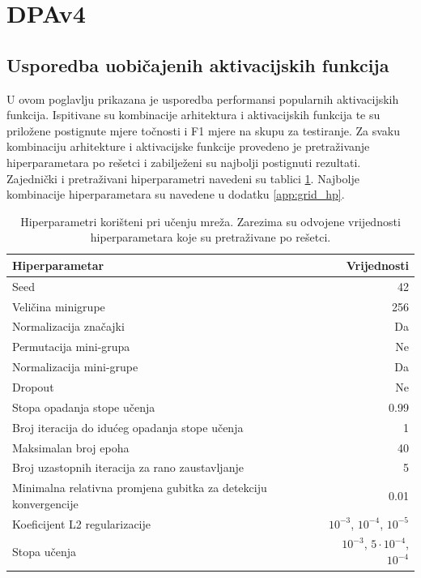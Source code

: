 \documentclass[times, utf8, numeric, diplomski]{fer}
\begin{document}
\section{DPAv4}

\subsection{Usporedba uobičajenih aktivacijskih funkcija}

U ovom poglavlju prikazana je usporedba performansi popularnih aktivacijskih funkcija. Ispitivane su kombinacije arhitektura i aktivacijskih funkcija te su priložene postignute mjere točnosti i F1 mjere na skupu za testiranje. Za svaku kombinaciju arhitekture i aktivacijske funkcije provedeno je pretraživanje hiperparametara po rešetci i zabilježeni su najbolji postignuti rezultati. Zajednički i pretraživani hiperparametri navedeni su tablici \ref{tab:hp_common}. Najbolje kombinacije hiperparametara su navedene u dodatku \ref{app:grid_hp}.

\begin{table}
\centering
\begin{tabular}{lr}
Hiperparametar & Vrijednosti \\
\hline
Seed & 42 \\
Veličina minigrupe & 256 \\
Normalizacija značajki & Da \\
Permutacija mini-grupa & Ne \\
Normalizacija mini-grupe & Da \\
Dropout & Ne \\
Stopa opadanja stope učenja & 0.99 \\
Broj iteracija do idućeg opadanja stope učenja & 1 \\
Maksimalan broj epoha & 40 \\
Broj uzastopnih iteracija za rano zaustavljanje & 5 \\
Minimalna relativna promjena gubitka za detekciju konvergencije & 0.01 \\
\hline
Koeficijent L2 regularizacije & $10^{-3}$, $10^{-4}$, $10^{-5}$ \\
Stopa učenja & $10^{-3}$, $5 \cdot 10^{-4}$, $10^{-4}$
\end{tabular}
\caption{Hiperparametri korišteni pri učenju mreža. Zarezima su odvojene vrijednosti hiperparametara koje su pretraživane po rešetci.}
\label{tab:hp_common}
\end{table}
\end{document}

